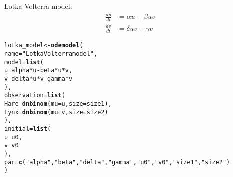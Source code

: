 \documentclass{article}\usepackage[]{graphicx}\usepackage[]{color}
\makeatletter
\newcommand{\hlstr}[1]{\textcolor[rgb]{0.192,0.494,0.8}{#1}}%
\newcommand{\hlopt}[1]{\textcolor[rgb]{0,0,0}{#1}}%
\newcommand{\hlstd}[1]{\textcolor[rgb]{0.345,0.345,0.345}{#1}}%
\newcommand{\hlkwb}[1]{\textcolor[rgb]{0.69,0.353,0.396}{#1}}%
\newcommand{\hlkwc}[1]{\textcolor[rgb]{0.333,0.667,0.333}{#1}}%
\newcommand{\hlkwd}[1]{\textcolor[rgb]{0.737,0.353,0.396}{\textbf{#1}}}%
\newenvironment{kframe}{%
 \def\at@end@of@kframe{}%
 \ifinner\ifhmode%
  \def\at@end@of@kframe{\end{minipage}}%
  \begin{minipage}{\columnwidth}%
 \fi\fi%
 \def\FrameCommand##1{\hskip\@totalleftmargin \hskip-\fboxsep
 \colorbox{shadecolor}{##1}\hskip-\fboxsep
     \hskip-\linewidth \hskip-\@totalleftmargin \hskip\columnwidth}%
 \MakeFramed {\advance\hsize-\width
   \@totalleftmargin\z@ \linewidth\hsize
   \@setminipage}}%
 {\par\unskip\endMakeFramed%
 \at@end@of@kframe}
\newenvironment{knitrout}{}{} %
\makeatother
\begin{document}
Lotka-Volterra model:
\begin{equation}
\begin{aligned}
\frac{du}{dt} &= \alpha u - \beta uv\\
\frac{dv}{dt} &= \delta uv - \gamma v
\end{aligned}
\end{equation}
\begin{knitrout}
\color{fgcolor}\begin{kframe}
\begin{alltt}
\hlstd{lotka_model} \hlkwb{<-} \hlkwd{odemodel}\hlstd{(}
    \hlkwc{name}\hlstd{=}\hlstr{"Lotka Volterra model"}\hlstd{,}
    \hlkwc{model}\hlstd{=}\hlkwd{list}\hlstd{(}
        \hlstd{u} \hlopt{~} \hlstd{alpha} \hlopt{*} \hlstd{u} \hlopt{-} \hlstd{beta} \hlopt{*} \hlstd{u} \hlopt{*} \hlstd{v,}
        \hlstd{v} \hlopt{~} \hlstd{delta} \hlopt{*} \hlstd{u} \hlopt{*} \hlstd{v} \hlopt{-} \hlstd{gamma} \hlopt{*} \hlstd{v}
    \hlstd{),}
    \hlkwc{observation}\hlstd{=}\hlkwd{list}\hlstd{(}
        \hlstd{Hare} \hlopt{~} \hlkwd{dnbinom}\hlstd{(}\hlkwc{mu}\hlstd{=u,} \hlkwc{size}\hlstd{=size1),}
        \hlstd{Lynx} \hlopt{~} \hlkwd{dnbinom}\hlstd{(}\hlkwc{mu}\hlstd{=v,} \hlkwc{size}\hlstd{=size2)}
    \hlstd{),}
    \hlkwc{initial}\hlstd{=}\hlkwd{list}\hlstd{(}
        \hlstd{u} \hlopt{~} \hlstd{u0,}
        \hlstd{v} \hlopt{~} \hlstd{v0}
    \hlstd{),}
    \hlkwc{par}\hlstd{=}\hlkwd{c}\hlstd{(}\hlstr{"alpha"}\hlstd{,} \hlstr{"beta"}\hlstd{,} \hlstr{"delta"}\hlstd{,} \hlstr{"gamma"}\hlstd{,} \hlstr{"u0"}\hlstd{,} \hlstr{"v0"}\hlstd{,} \hlstr{"size1"}\hlstd{,} \hlstr{"size2"}\hlstd{)}
\hlstd{)}
\end{alltt}
\end{kframe}
\end{knitrout}
\end{document}
